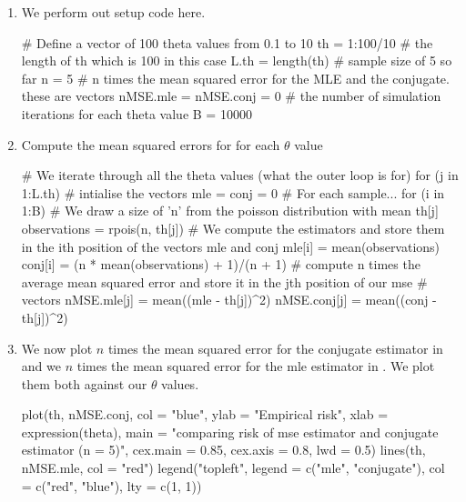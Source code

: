 \documentclass[12pt, a4paper]{article}\usepackage[]{graphicx}\usepackage[]{color}
\begin{document}


\pagestyle{default}
\thispagestyle{empty}

\newpage
\setcounter{page}{1}
\begin{enumerate}[label={\bfseries\arabic*.}]
  \item We perform out setup code here. 
\begin{Schunk}
\begin{Sinput}
# Define a vector of 100 theta values from 0.1 to 10
th = 1:100/10
# the length of th which is 100 in this case
L.th = length(th)
# sample size of 5 so far
n = 5
# n times the mean squared error for the MLE and the conjugate. these are vectors
nMSE.mle = nMSE.conj = 0
# the number of simulation iterations for each theta value
B = 10000
\end{Sinput}
\end{Schunk}
  \item Compute the mean squared errors for for each $\theta$ value
\begin{Schunk}
\begin{Sinput}
# We iterate through all the theta values (what the outer loop is for)
for (j in 1:L.th) {
    # intialise the vectors
    mle = conj = 0
    # For each sample...
    for (i in 1:B) {
        # We draw a size of 'n' from the poisson distribution with mean th[j]
        observations = rpois(n, th[j])
        # We compute the estimators and store them in the ith position of the vectors mle and conj
        mle[i] = mean(observations)
        conj[i] = (n * mean(observations) + 1)/(n + 1)
    }
    # compute n times the average mean squared error and store it in the jth position of our mse
    # vectors
    nMSE.mle[j] = mean((mle - th[j])^2)
    nMSE.conj[j] = mean((conj - th[j])^2)
}
\end{Sinput}
\end{Schunk}
  \item We now plot $n$ times the mean squared error for the conjugate estimator in  and we $n$ times the mean squared error for the mle estimator in . We plot them both against our $\theta$ values. 
\begin{Schunk}
\begin{Sinput}
plot(th, nMSE.conj, col = "blue", ylab = "Empirical risk", xlab = expression(theta), main = "comparing risk of mse estimator and conjugate estimator (n = 5)",
    cex.main = 0.85, cex.axis = 0.8, lwd = 0.5)
lines(th, nMSE.mle, col = "red")
legend("topleft", legend = c("mle", "conjugate"), col = c("red", "blue"), lty = c(1, 1))
\end{Sinput}



\end{Schunk}
\end{enumerate}
\end{document}
